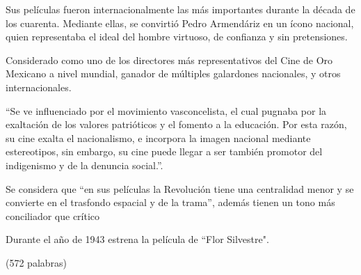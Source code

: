     \begin{compactitem}
    \item Sus películas fueron internacionalmente las más importantes durante la década de los cuarenta. Mediante ellas, se convirtió Pedro Armendáriz en un ícono nacional, quien  representaba el ideal del hombre virtuoso, de confianza y sin pretensiones.\autocite[522]{peter_desarrollo_2008}
    \item Considerado como uno de los directores más representativos del Cine de Oro Mexicano a nivel mundial, ganador de múltiples galardones nacionales, y otros  internacionales. \autocite[9]{aguilar_construccion_2014}
    \item ``Se ve influenciado por el movimiento vasconcelista, el cual pugnaba por la exaltación de los valores patrióticos y el fomento a la educación. Por esta razón, su cine exalta el nacionalismo, e incorpora la imagen nacional mediante estereotipos, sin embargo, su cine puede llegar a ser también promotor del indigenismo y de la denuncia social.''\autocite[9-10]{aguilar_construccion_2014}.
    \item Se considera que ``en sus películas la Revolución tiene una centralidad menor y se convierte en el
    trasfondo espacial y  de la trama''\autocite[111]{piedras_narrativas_2012}, además tienen un tono más conciliador que crítico\autocite{piedras_narrativas_2012}
    \item Durante el año de 1943 estrena la película de ``Flor
    Silvestre"\autocite{fernandez_flor_1946}.\autocite{_flor_????}
    \end{compactitem} 

(572 palabras)
\pagebreak

